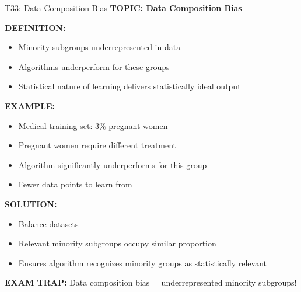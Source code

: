 \documentclass[8pt]{beamer}
\begin{document}
	\begin{frame}{T33: Data Composition Bias}
		\fontsize{6.5}{7.5}\selectfont
		\textbf{TOPIC: Data Composition Bias}
		
		\vspace{0.1cm}
		\textbf{DEFINITION:}
		\begin{itemize}
			\item Minority subgroups underrepresented in data
			\item Algorithms underperform for these groups
			\item Statistical nature of learning delivers statistically ideal output
		\end{itemize}
		
		\vspace{0.1cm}
		\textbf{EXAMPLE:}
		\begin{itemize}
			\item Medical training set: 3\% pregnant women
			\item Pregnant women require different treatment
			\item Algorithm significantly underperforms for this group
			\item Fewer data points to learn from
		\end{itemize}
		
		\vspace{0.1cm}
		\textbf{SOLUTION:}
		\begin{itemize}
			\item Balance datasets
			\item Relevant minority subgroups occupy similar proportion
			\item Ensures algorithm recognizes minority groups as statistically relevant
		\end{itemize}
		
		\textcolor{myred}{\textbf{EXAM TRAP:}} Data composition bias = \textcolor{myblue}{underrepresented minority subgroups}!
	\end{frame}
	
\end{document}
